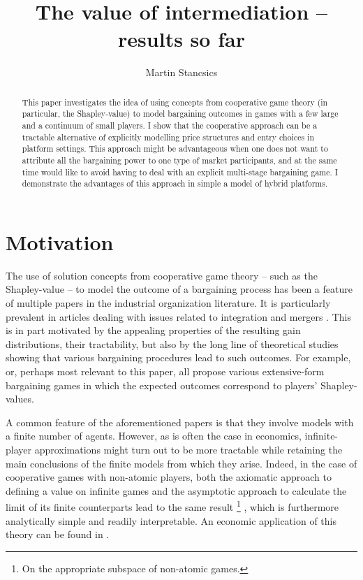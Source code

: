 \documentclass[a4paper]{article}
\title{The value of intermediation -- results so far}
\author{Martin Stancsics}
\begin{document}
\maketitle

\begin{abstract}
    This paper investigates the idea of using concepts from cooperative game theory (in particular, the Shapley-value) to model bargaining outcomes in games with a few large and a continuum of small players. I show that the cooperative approach can be a tractable alternative of explicitly modelling price structures and entry choices in platform settings. This approach might be advantageous when one does not want to attribute all the bargaining power to one type of market participants, and at the same time would like to avoid having to deal with an explicit multi-stage bargaining game. I demonstrate the advantages of this approach in simple a model of hybrid platforms.
\end{abstract}


\section{Motivation}

The use of solution concepts from cooperative game theory -- such as the Shapley-value -- to model the outcome of a bargaining process has been a feature of multiple papers in the industrial organization literature. It is particularly prevalent in articles dealing with issues related to integration and mergers \parencite[e.g.][]{hart1990property,segal2003collusion,inderst2003bargaining,montez2007downstream}. This is in part motivated by the appealing properties of the resulting gain distributions, their tractability, but also by the long line of theoretical studies showing that various bargaining procedures lead to such outcomes. For example, \textcite{gul1989bargaining,winter1994demand,hart1996bargaining,inderst2003bargaining,} or, perhaps most relevant to this paper, \textcite{stole1996intra} all propose various extensive-form bargaining games in which the expected outcomes correspond to players' Shapley-values.

A common feature of the aforementioned papers is that they involve models with a finite number of agents. However, as is often the case in economics, infinite-player approximations might turn out to be more tractable while retaining the main conclusions of the finite models from which they arise. Indeed, in the case of cooperative games with non-atomic players, both the axiomatic approach to defining a value on infinite games and the asymptotic approach to calculate the limit of its finite counterparts lead to the same result \footnote{On the appropriate subspace of non-atomic games.} \parencite{aumann2015values}, which is furthermore analytically simple and readily interpretable. An economic application of this theory can be found in \textcite{billera1978internal}.
\end{document}
